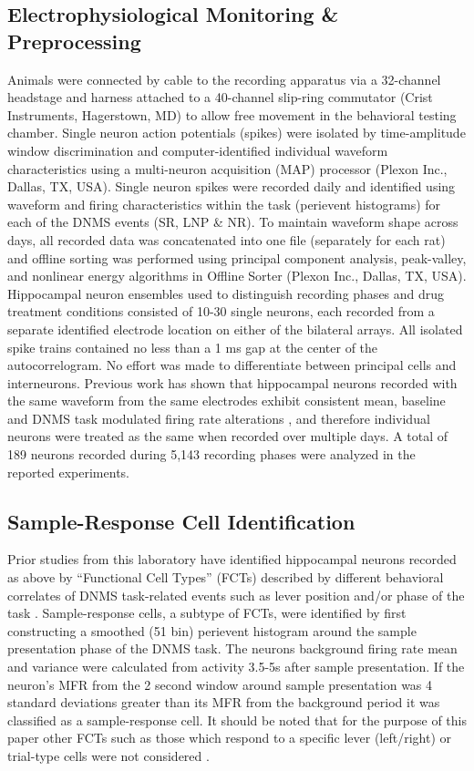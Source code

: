 \documentclass[11pt,a4paper,final]{article}
\begin{document}
    \subsection{Electrophysiological Monitoring \& Preprocessing}
Animals were connected by cable to the recording apparatus via a 32-channel headstage and harness attached to a 40-channel slip-ring commutator (Crist Instruments, Hagerstown, MD) to allow free movement in the behavioral testing chamber.
Single neuron action potentials (spikes) were isolated by time-amplitude window discrimination and computer-identified individual waveform characteristics using a multi-neuron acquisition (MAP) processor (Plexon Inc., Dallas, TX, USA).
Single neuron spikes were recorded daily and identified using waveform and firing characteristics within the task (perievent histograms) for each of the DNMS events (SR, LNP \& NR).
To maintain waveform shape across days, all recorded data was concatenated into one file (separately for each rat) and offline sorting was performed using principal component analysis, peak-valley, and nonlinear energy algorithms in Offline Sorter (Plexon Inc., Dallas, TX, USA).
Hippocampal neuron ensembles used to distinguish recording phases and drug treatment conditions consisted of 10-30 single neurons, each recorded from a separate identified electrode location on either of the bilateral arrays.
All isolated spike trains contained no less than a 1 ms gap at the center of the autocorrelogram.
No effort was made to differentiate between principal cells and interneurons.
Previous work has shown that hippocampal neurons recorded  with the same waveform from the same electrodes exhibit consistent mean, baseline and DNMS task modulated firing rate alterations \citep{deadwyler96,hampson99}, and therefore individual neurons were treated as the same when recorded over multiple days.
A total of 189 neurons recorded during 5,143 recording phases were analyzed in the reported experiments.

    \subsection{Sample-Response Cell Identification}
Prior studies from this laboratory  have  identified  hippocampal neurons recorded as above by “Functional Cell Types” (FCTs) described by different behavioral correlates of DNMS task-related events such as lever position and/or phase of the task \citep{hampson99,goon10}.
Sample-response cells, a subtype of FCTs, were identified by first constructing a smoothed (51 bin) perievent histogram around the sample presentation phase of the DNMS task.
The neurons background firing rate mean and variance were calculated from activity 3.5-5s after sample presentation.
If the neuron's MFR from the 2 second window around sample presentation was 4 standard deviations greater than its MFR from the background period it was classified as a sample-response cell.
It should be noted that for the purpose of this paper other FCTs such as those which respond to a specific lever (left/right) or trial-type cells were not considered \citep{hampson12b}.
\end{document}
